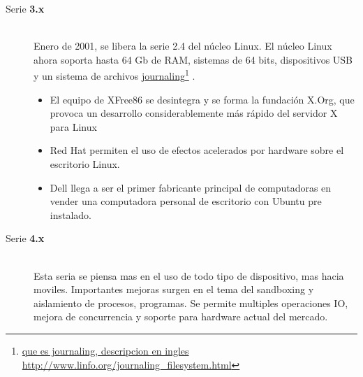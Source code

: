 \documentclass[paper=a4, fontsize=12pt]{article} 		%
\newcommand\fnurl[2]{%
\href{#2}{#1}\footnote{\url{#2}}%
}
\numberwithin{equation}{section}						%
\numberwithin{table}{section} 							%
\begin{document}
\begin{description}
\begin{itemize}
  \end{itemize}
  \item[Serie \textbf{3.x}] \hfill \\Enero de 2001, se libera la serie 2.4 del núcleo Linux. El núcleo Linux ahora soporta hasta 64 Gb de RAM, sistemas de 64 bits, dispositivos USB y un sistema de archivos \fnurl{journaling}{que es journaling, descripcion en ingles http://www.linfo.org/journaling_filesystem.html}.
  \begin{itemize}
  \item  El equipo de XFree86 se desintegra y se forma la fundación X.Org, que provoca un desarrollo considerablemente más rápido del servidor X para Linux
  \item Red Hat permiten el uso de efectos acelerados por hardware sobre el escritorio Linux.
  \item Dell llega a ser el primer fabricante principal de computadoras en vender una computadora personal de escritorio con Ubuntu pre instalado.
  \end{itemize}

  \item[Serie \textbf{4.x}] \hfill \\ Esta seria se piensa mas en el uso de  todo tipo de dispositivo, mas hacia moviles. Importantes mejoras surgen en  el tema del sandboxing y aislamiento de procesos, programas. Se permite multiples operaciones IO, mejora de concurrencia y soporte para hardware actual del mercado. 
\end{description}
\begin{figure}[H]
 	\centering
\end{figure}
\end{document}
